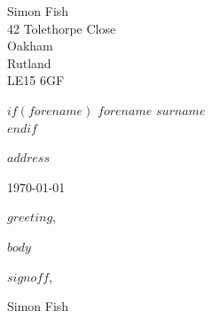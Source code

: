 \documentclass{article}
\begin{document}
\setlength{\parindent}{0em}
\begin{flushright}
	Simon Fish\\
	42 Tolethorpe Close\\
	Oakham\\
	Rutland\\
	LE15 6GF\\
\end{flushright}

$if(forename)$
  $forename$ $surname$ \\
$endif$

$address$

\bigskip

\today
\bigskip

$greeting$,
\setlength{\parindent}{2em}
\setlength{\parskip}{0.5cm plus4mm minus3mm}
\bigskip

$body$

\bigskip

$signoff$,

\vspace{2\baselineskip}

Simon Fish
\end{document}
